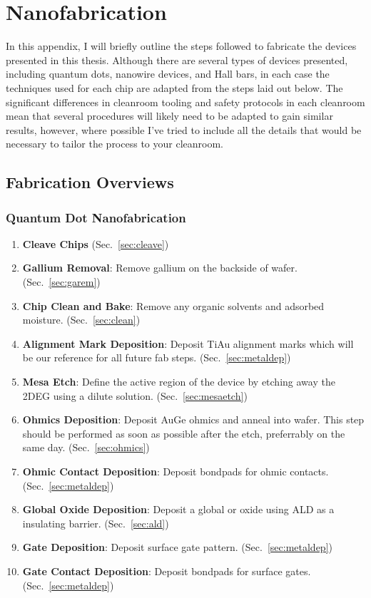 \chapter{Nanofabrication}
\label{sec:fab}
In this appendix, I will briefly outline the steps followed to fabricate the devices presented in this thesis.
Although there are several types of devices presented, including quantum dots, nanowire devices, and Hall bars,
in each case the techniques used for each chip are adapted from the steps laid out below. The significant differences
in cleanroom tooling and safety protocols in each cleanroom mean that several procedures will likely need to be
adapted to gain similar results, however, where possible I've tried to include all the details that would be necessary
to tailor the process to your cleanroom.

\section{Fabrication Overviews}
\label{sec:fab_overview}

\subsection{Quantum Dot Nanofabrication}
\begin{enumerate}
    \item \textbf{Cleave Chips} (Sec.~\ref{sec:cleave})
    \item \textbf{Gallium Removal}: Remove gallium on the backside of wafer. (Sec.~\ref{sec:garem})
    \item \textbf{Chip Clean and Bake}: Remove any organic solvents and adsorbed moisture. (Sec.~\ref{sec:clean})
    \item \textbf{Alignment Mark Deposition}: Deposit TiAu alignment marks which will be our reference for all future fab steps. (Sec.~\ref{sec:metaldep})
    \item \textbf{Mesa Etch}: Define the active region of the device by etching away the 2DEG using a dilute  solution. (Sec.~\ref{sec:mesaetch})
    \item \textbf{Ohmics Deposition}: Deposit AuGe ohmics and anneal into wafer. This step should be performed as soon as possible after the etch, preferrably on the same day. (Sec.~\ref{sec:ohmics})
    \item \textbf{Ohmic Contact Deposition}: Deposit bondpads for ohmic contacts. (Sec.~\ref{sec:metaldep})
    \item \textbf{Global Oxide Deposition}: Deposit a global  or  oxide using ALD as a insulating barrier. (Sec.~\ref{sec:ald})
    \item \textbf{Gate Deposition}: Deposit surface gate pattern. (Sec.~\ref{sec:metaldep})
    \item \textbf{Gate Contact Deposition}: Deposit bondpads for surface gates. (Sec.~\ref{sec:metaldep})
\end{enumerate}

